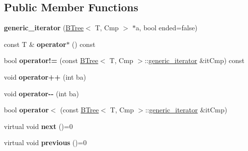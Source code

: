 \subsection*{Public Member Functions}
\begin{DoxyCompactItemize}
\item 
\hypertarget{classBTree_1_1generic__iterator_a517efc73aa11d56062e0e02ca7a1df0d}{
{\bfseries generic\_\-iterator} (\hyperlink{classBTree}{BTree}$<$ T, Cmp $>$ $\ast$a, bool ended=false)}
\label{classBTree_1_1generic__iterator_a517efc73aa11d56062e0e02ca7a1df0d}

\item 
\hypertarget{classBTree_1_1generic__iterator_a0bbdec83e3269bc1c1b0c8f5f2fc94e0}{
const T \& {\bfseries operator$\ast$} () const }
\label{classBTree_1_1generic__iterator_a0bbdec83e3269bc1c1b0c8f5f2fc94e0}

\item 
\hypertarget{classBTree_1_1generic__iterator_abfb7311d27602e1dc909d9239457d272}{
bool {\bfseries operator!=} (const \hyperlink{classBTree}{BTree}$<$ T, Cmp $>$::\hyperlink{classBTree_1_1generic__iterator}{generic\_\-iterator} \&itCmp) const }
\label{classBTree_1_1generic__iterator_abfb7311d27602e1dc909d9239457d272}

\item 
\hypertarget{classBTree_1_1generic__iterator_ad8bfbbd09a1d55c8f2d6dda5d59a53e3}{
void {\bfseries operator++} (int ba)}
\label{classBTree_1_1generic__iterator_ad8bfbbd09a1d55c8f2d6dda5d59a53e3}

\item 
\hypertarget{classBTree_1_1generic__iterator_a66cbfb790427225fa52d1509c366e186}{
void {\bfseries operator-\/-\/} (int ba)}
\label{classBTree_1_1generic__iterator_a66cbfb790427225fa52d1509c366e186}

\item 
\hypertarget{classBTree_1_1generic__iterator_ae599b70c16505b2ff300c599dc7787a7}{
bool {\bfseries operator$<$} (const \hyperlink{classBTree}{BTree}$<$ T, Cmp $>$::\hyperlink{classBTree_1_1generic__iterator}{generic\_\-iterator} \&itCmp)}
\label{classBTree_1_1generic__iterator_ae599b70c16505b2ff300c599dc7787a7}

\item 
\hypertarget{classBTree_1_1generic__iterator_acf330d4cb3bc8fde3976571eaa3b5fb3}{
virtual void {\bfseries next} ()=0}
\label{classBTree_1_1generic__iterator_acf330d4cb3bc8fde3976571eaa3b5fb3}

\item 
\hypertarget{classBTree_1_1generic__iterator_aec59d969337997036619fba7fdf4da36}{
virtual void {\bfseries previous} ()=0}
\label{classBTree_1_1generic__iterator_aec59d969337997036619fba7fdf4da36}


\end{DoxyCompactItemize}
